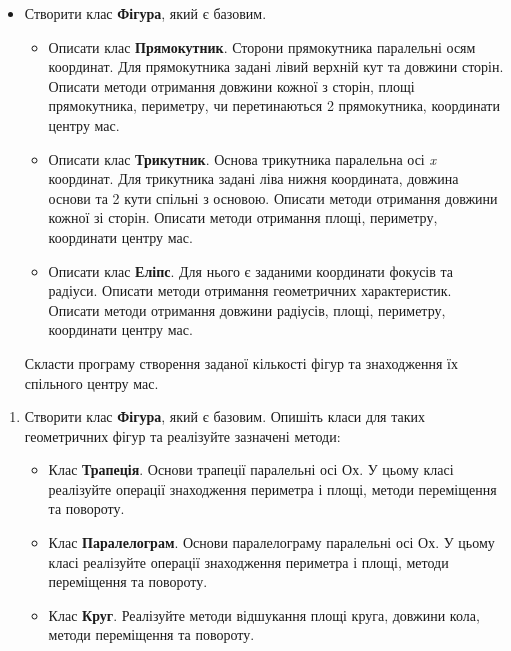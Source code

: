 \documentclass[]{article}
\begin{document}
\begin{itemize}
\item
  Створити клас \textbf{Фігура}, який є базовим.

  \begin{itemize}
  \item
    Описати клас \textbf{Прямокутник}. Сторони прямокутника паралельні
    осям координат. Для прямокутника задані лівий верхній кут та довжини
    сторін. Описати методи отримання довжини кожної з сторін, площі
    прямокутника, периметру, чи перетинаються 2 прямокутника, координати
    центру мас.
  \item
    Описати клас \textbf{Трикутник}. Основа трикутника паралельна осі
    \emph{x} координат. Для трикутника задані ліва нижня координата,
    довжина основи та 2 кути спільні з основою. Описати методи отримання
    довжини кожної зі сторін. Описати методи отримання площі, периметру,
    координати центру мас.
  \item
    Описати клас \textbf{Еліпс}. Для нього є заданими координати фокусів
    та радіуси. Описати методи отримання геометричних характеристик.
    Описати методи отримання довжини радіусів, площі, периметру,
    координати центру мас.
  \end{itemize}

  Скласти програму створення заданої кількості фігур та знаходження їх
  спільного центру мас.
\end{itemize}

\begin{enumerate}
\def\labelenumi{\arabic{enumi}.}
\item
  Створити клас \textbf{Фігура}, який є базовим. Опишіть класи для таких
  геометричних фігур та реалізуйте зазначені методи:

  \begin{itemize}
  \item
    Клас \textbf{Трапеція}. Основи трапеції паралельні осі Ох. У цьому
    класі реалізуйте операції знаходження периметра і площі, методи
    переміщення та повороту.
  \item
    Клас \textbf{Паралелограм}. Основи паралелограму паралельні осі Ох.
    У цьому класі реалізуйте операції знаходження периметра і площі,
    методи переміщення та повороту.
  \item
    Клас \textbf{Круг}. Реалізуйте методи відшукання площі круга,
    довжини кола, методи переміщення та повороту.
  \end{itemize}
\end{enumerate}
\end{document}
